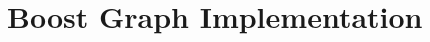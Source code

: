 \documentclass[letterpaper, 12pt]{article}
\theoremstyle{definition}
\theoremstyle{definition}
\theoremstyle{thm}
\theoremstyle{definition}
\begin{document}
\begin{comment}
Let us define the paths $P_1=p_1p_2\ldots p_j$, $P_2=p_jp_{j+1}\ldots p_k$,
$Q_1=q_1q_2\ldots q_j$, and $Q_2=q_jq_{j+1}\ldots q_l$. Observe we then have
the cycle $C_P$ consisting of $P_1$, $T$, and the edges $p_1t_1$ and $p_jt_r$.
Similarly we have the cycle $C_Q$ consisting of $T$, $Q_1$, and the edges $q_1t_1$ and
$q_jt_r$. We apply the algorithm to $P_1$ and $T$ to color $\text{Int}(C_P)$
and similarly to $T$ and $Q_1$ to color $\text{Int}(C_Q)$. If $i=k$ and
$j=l$ we are done. Otherwise, we have the cycle $C'$ consisting of $P_2$,
$Q_2$ and the edges $p_iq_j$ and $p_kq_l$ and we apply the algorithm to $P_2$
and $Q_2$ to color $\text{Int}(C')$.

\end{comment}

\section{Boost Graph Implementation}
\end{document}
